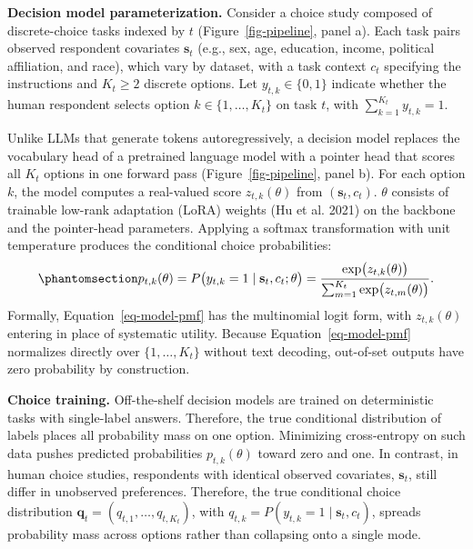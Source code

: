 \documentclass[
  11pt,
  letterpaper,
]{article}
\begin{document}
\textbf{Decision model parameterization.} Consider a choice study
composed of discrete-choice tasks indexed by \(t\)
(Figure~\ref{fig-pipeline}, panel a). Each task pairs observed
respondent covariates \(\mathbf{s}_t\) (e.g., sex, age, education,
income, political affiliation, and race), which vary by dataset, with a
task context \(c_t\) specifying the instructions and \(K_t \ge 2\)
discrete options. Let \(y_{t,k} \in \{0, 1\}\) indicate whether the
human respondent selects option \(k \in \{1, \dots, K_t\}\) on task
\(t\), with \(\sum_{k=1}^{K_t} y_{t,k} = 1\).

Unlike LLMs that generate tokens autoregressively, a decision model
replaces the vocabulary head of a pretrained language model with a
pointer head that scores all \(K_t\) options in one forward pass
(Figure~\ref{fig-pipeline}, panel b). For each option \(k\), the model
computes a real-valued score \(z_{t,k}(\theta)\) from
\((\mathbf{s}_t, c_t)\). \(\theta\) consists of trainable low-rank
adaptation (LoRA) weights (Hu et al. 2021) on the backbone and the
pointer-head parameters. Applying a softmax transformation with unit
temperature produces the conditional choice probabilities:
\begin{equation}\protect\phantomsection\label{eq-model-pmf}{
p_{t,k}(\theta) = P\big(y_{t,k} = 1 \mid \mathbf{s}_t, c_t; \theta\big) = \frac{\exp\!\big(z_{t,k}(\theta)\big)}{\sum_{m=1}^{K_t} \exp\!\big(z_{t,m}(\theta)\big)}.
}\end{equation} Formally, Equation~\ref{eq-model-pmf} has the
multinomial logit form, with \(z_{t,k}(\theta)\) entering in place of
systematic utility. Because Equation~\ref{eq-model-pmf} normalizes
directly over \(\{1, \dots, K_t\}\) without text decoding, out-of-set
outputs have zero probability by construction.

\textbf{Choice training.} Off-the-shelf decision models are trained on
deterministic tasks with single-label answers. Therefore, the true
conditional distribution of labels places all probability mass on one
option. Minimizing cross-entropy on such data pushes predicted
probabilities \(p_{t,k}(\theta)\) toward zero and one. In contrast, in
human choice studies, respondents with identical observed covariates,
\(\mathbf{s}_t\), still differ in unobserved preferences. Therefore, the
true conditional choice distribution
\(\mathbf{q}_t = (q_{t,1}, \dots, q_{t,K_t})\), with
\(q_{t,k} = P(y_{t,k} = 1 \mid \mathbf{s}_t, c_t)\), spreads probability
mass across options rather than collapsing onto a single mode.
\end{document}

